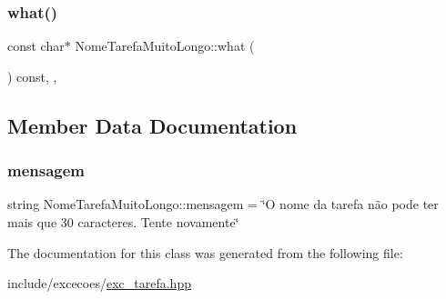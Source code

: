 \subsubsection{\texorpdfstring{what()}{what()}}
{\footnotesize\ttfamily const char$\ast$ Nome\+Tarefa\+Muito\+Longo\+::what (\begin{DoxyParamCaption}{ }\end{DoxyParamCaption}) const\hspace{0.3cm}{\ttfamily [inline]}, {\ttfamily [override]}, {\ttfamily [noexcept]}}



\subsection{Member Data Documentation}
\mbox{\label{classNomeTarefaMuitoLongo_a72f730ba8580b5cd8efc1cee8f9ca4c9}} 
\subsubsection{\texorpdfstring{mensagem}{mensagem}}
{\footnotesize\ttfamily string Nome\+Tarefa\+Muito\+Longo\+::mensagem = \char`\"{}O nome da tarefa não pode ter mais que 30 caracteres. Tente novamente\char`\"{}\hspace{0.3cm}{\ttfamily [private]}}



The documentation for this class was generated from the following file\+:\begin{DoxyCompactItemize}
\item 
include/excecoes/\hyperlink{exc__tarefa_8hpp}{exc\+\_\+tarefa.\+hpp}\end{DoxyCompactItemize}
